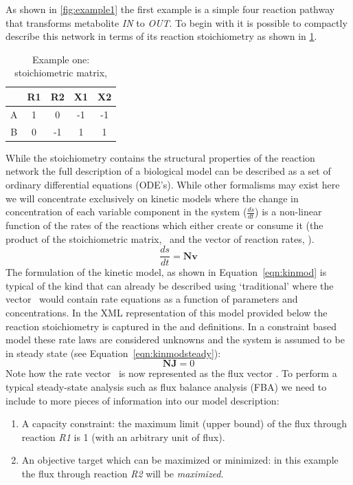 As shown in \ref{fig:example1} the first example is a simple four reaction
pathway that transforms metabolite \textit{IN} to \textit{OUT}. To begin
with it is possible to compactly describe this network in terms of its
reaction stoichiometry as shown in \ref{tble:ex1nmat}.
\begin{table}[h]
  \centering
    \begin{tabular}{c|cccc}
          & R1 & R2 & X1 & X2 \\ \hline
        A & 1 &  0 & -1 & -1 \\
        B & 0 & -1 &  1 &  1 \\
    \end{tabular}
  \caption{Example one: stoichiometric matrix, \Nmat}
  \label{tble:ex1nmat}
\end{table}
%
While the stoichiometry contains the structural properties of the reaction
network the full description of a biological model can be described as a set
of ordinary differential equations (ODE's). While other formalisms may exist
here we will concentrate exclusively on kinetic models where the change in
concentration of each variable component in the system ($\frac{ds}{dt}$) is
a non-linear function of the rates of the reactions which either create or
consume it (the product of the stoichiometric matrix, \Nmat\ and the vector
of reaction rates, \vvec).
%
\begin{equation}\label{eqn:kinmod}
  \frac{ds}{dt} = \textbf{Nv}
\end{equation}
%
The formulation of the kinetic model, as shown in Equation~\ref{eqn:kinmod}
is typical of the kind that can already be described using `traditional'
\SBML where the vector \vvec\ would contain rate equations as a function of
parameters and concentrations. In the XML representation of this model
provided below the reaction stoichiometry is captured in the \Species and
\Reaction definitions. In a constraint based model these rate laws are
considered unknowns and the system is assumed to be in steady state (see
Equation~\ref{eqn:kinmodsteady}):
%
\begin{equation}\label{eqn:kinmodsteady}
  \textbf{NJ} = 0
\end{equation}
%
Note how the rate vector \vvec\ is now represented as the flux vector \Jvec.
To perform a typical steady-state analysis such as flux balance analysis
(FBA) we need to include to more pieces of information into our model
description:
%
\begin{enumerate}
  \item A capacity constraint: the maximum limit (upper bound) of the flux
      through reaction \textit{R1} is 1 (with an arbitrary unit of flux).
  \item An objective target which can be maximized or minimized: in this
      example the  flux through reaction \textit{R2} will be
      \textit{maximized}.
\end{enumerate}
